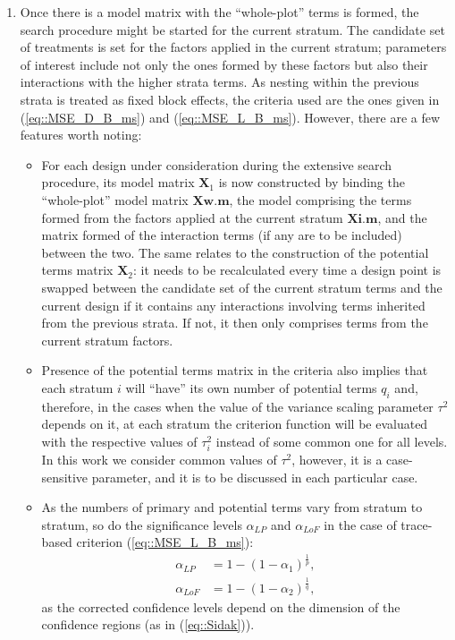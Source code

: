 \begin{enumerate}
\item Once there is a model matrix with the ``whole-plot'' terms is formed, the search procedure might be started for the current stratum. The candidate set of treatments is set for the factors applied in the current stratum; parameters of interest include not only the ones formed by these factors but also their interactions with the higher strata terms. As nesting within the previous strata is treated as fixed block effects, the criteria used are the ones given in (\ref{eq::MSE_D_B_ms}) and (\ref{eq::MSE_L_B_ms}). However, there are a few features worth noting:
\begin{itemize}
\item For each design under consideration during the extensive search procedure, its model matrix $\bm{X}_1$ is now constructed by binding the ``whole-plot'' model matrix $\bm{Xw.m}$, the model comprising the terms formed from the factors applied at the current stratum $\bm{Xi.m}$, and the matrix formed of the interaction terms (if any are to be included) between the two. The same relates to the construction of the potential terms matrix $\bm{X}_2$: it needs to be recalculated every time a design point is swapped between the candidate set of the current stratum terms and the current design if it contains any interactions involving terms inherited from the previous strata. If not, it then only comprises terms from the current stratum factors.
\item Presence of the potential terms matrix in the criteria also implies that each stratum $i$ will ``have'' its own number of potential terms $q_i$ and, therefore, in the cases when the value of the variance scaling parameter $\tau^2$ depends on it, at each stratum the criterion function will be evaluated with the respective values of $\tau^2_i$ instead of some common one for all levels. In this work we consider common values of $\tau^2$, however, it is a case-sensitive parameter, and it is to be discussed in each particular case.
\item As the numbers of primary and potential terms vary from stratum to stratum, so do the significance levels $\alpha_{LP}$ and $\alpha_{LoF}$ in the case of trace-based criterion (\ref{eq::MSE_L_B_ms}):
\begin{align*}
\alpha_{LP}&=1-(1-\alpha_1)^{\frac{1}{p}},\\
\alpha_{LoF}&=1-(1-\alpha_2)^{\frac{1}{q}},
\end{align*}
as the corrected confidence levels depend on the dimension of the confidence regions (as in (\ref{eq::Sidak})). 

\end{itemize}
\end{enumerate}
